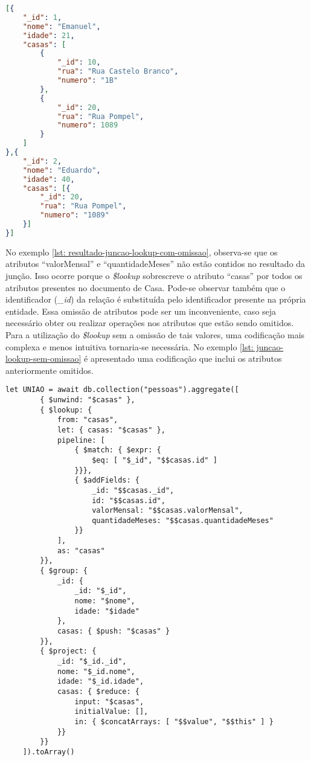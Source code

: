 
\begin{lstlisting}[language=json, caption={Resultado da Junção com Omissão\label{lst: resultado-juncao-lookup-com-omissao}}]
[{
    "_id": 1,
    "nome": "Emanuel",
    "idade": 21,
    "casas": [
        {
            "_id": 10,
            "rua": "Rua Castelo Branco",
            "numero": "1B"
        },
        {
            "_id": 20,
            "rua": "Rua Pompel",
            "numero": 1089
        }
    ]
},{
    "_id": 2,
    "nome": "Eduardo",
    "idade": 40,
    "casas": [{
        "_id": 20,
        "rua": "Rua Pompel",
        "numero": "1089"
    }]
}]
\end{lstlisting}

No exemplo \ref{lst: resultado-juncao-lookup-com-omissao}, observa-se que os atributos ``valorMensal'' e ``quantidadeMeses'' não estão contidos no resultado da junção. Isso ocorre porque o \textit{\$lookup} sobrescreve o atributo ``casas'' por todos os atributos presentes no documento de Casa. Pode-se observar também que o identificador (\textit{\_id}) da relação é substituída pelo identificador presente na própria entidade. Essa omissão de atributos pode ser um inconveniente, caso seja necessário obter ou realizar operações nos atributos que estão sendo omitidos. Para a utilização do \textit{\$lookup} sem a omissão de tais valores, uma codificação mais complexa e menos intuitiva tornaria-se necessária. No exemplo \ref{lst: juncao-lookup-sem-omissao} é apresentado uma codificação que inclui os atributos anteriormente omitidos.

\begin{lstlisting}[style=ES6, caption={Junção de Documentos sem Omissão\label{lst: juncao-lookup-sem-omissao}}]
    let UNIAO = await db.collection("pessoas").aggregate([
        { $unwind: "$casas" },
        { $lookup: {
            from: "casas",
            let: { casas: "$casas" },
            pipeline: [
                { $match: { $expr: {
                    $eq: [ "$_id", "$$casas.id" ]
                }}},
                { $addFields: {
                    _id: "$$casas._id",
                    id: "$$casas.id",
                    valorMensal: "$$casas.valorMensal",
                    quantidadeMeses: "$$casas.quantidadeMeses"
                }}
            ],
            as: "casas"
        }},
        { $group: {
            _id: {
                _id: "$_id",
                nome: "$nome",
                idade: "$idade"
            },
            casas: { $push: "$casas" }
        }},
        { $project: {
            _id: "$_id._id",
            nome: "$_id.nome",
            idade: "$_id.idade",
            casas: { $reduce: {
                input: "$casas",
                initialValue: [],
                in: { $concatArrays: [ "$$value", "$$this" ] }
            }}
        }}
    ]).toArray()
\end{lstlisting}

